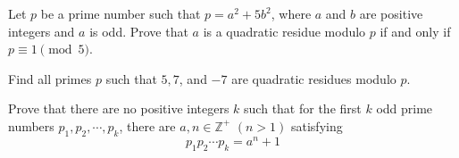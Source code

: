 \begin{problem}
	Let $p$ be a prime number such that $p=a^2+5b^2$, where $a$ and $b$ are positive integers and $a$ is odd. Prove that $a$ is a quadratic residue modulo $p$ if and only if $p \equiv 1 \pmod 5$.
\end{problem}


\begin{problem} %
	Find all primes $p$ such that $5,7$, and $-7$ are quadratic residues modulo $p$.
\end{problem}



\begin{problem}
	Prove that there are no positive integers $k$ such that for the first $k$ odd prime numbers $p_1,p_2,\cdots,p_k$, there are $a,n\in\mathbb{Z}^+$ $(n>1)$ satisfying \[ p_1p_2\cdots p_k=a^n+1\] %
\end{problem}

